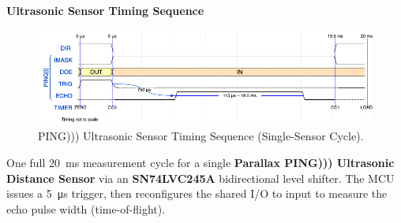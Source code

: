 \documentclass[12pt]{article}
\begin{document}
\begin{center}
    {\LARGE \textbf{Ultrasonic Sensor Timing Sequence}}\\[0.5em]
\end{center}
\begin{figure}[h!]
    \centering
    \includegraphics[width=0.95\linewidth]{ping_timing_diagram.png}
    \caption{\small PING))) Ultrasonic Sensor Timing Sequence (Single-Sensor Cycle).}
    \label{fig:ping_timing}
\end{figure}

\small

\noindent One full \SI{20}{ms} measurement cycle for a single \textbf{Parallax PING))) Ultrasonic Distance Sensor} via an \textbf{SN74LVC245A} bidirectional level shifter. The MCU issues a \SI{5}{\micro\second} trigger, then reconfigures the shared I/O to input to measure the echo pulse width (time-of-flight).
\end{document}
